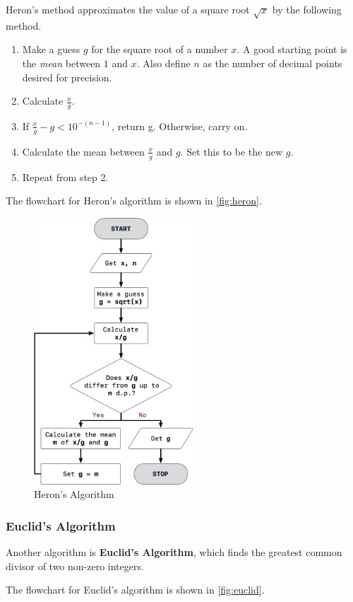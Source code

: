 Heron's method approximates the value of a square root \(\sqrt{x}\) by the following method.

\begin{enumerate}
  	\item Make a guess \(g\) for the square root of a number \(x\). A good starting point is the \emph{mean} between \(1\) and \(x\). Also define \(n\) as the number of decimal points desired for precision.
	\item Calculate \(\frac{x}{g}\).
	\item If \(\frac{x}{g} - g < 10^{-(n-1)}\), return g. Otherwise, carry on.
	\item Calculate the mean between \( \frac{x}{g}\) and \(g\). Set this to be the new \(g\).
	\item Repeat from step 2.
\end{enumerate}
The flowchart for Heron's algorithm is shown in \autoref{fig:heron}.

\begin{figure}[ht]
\centering
\includegraphics[width=6cm]{heron}
\caption{Heron's Algorithm}\label{fig:heron}
\end{figure}

\subsubsection{Euclid's Algorithm}
Another algorithm is \textbf{Euclid's Algorithm}, which finds the greatest common divisor of two non-zero integers.

The flowchart for Euclid's algorithm is shown in \autoref{fig:euclid}.

